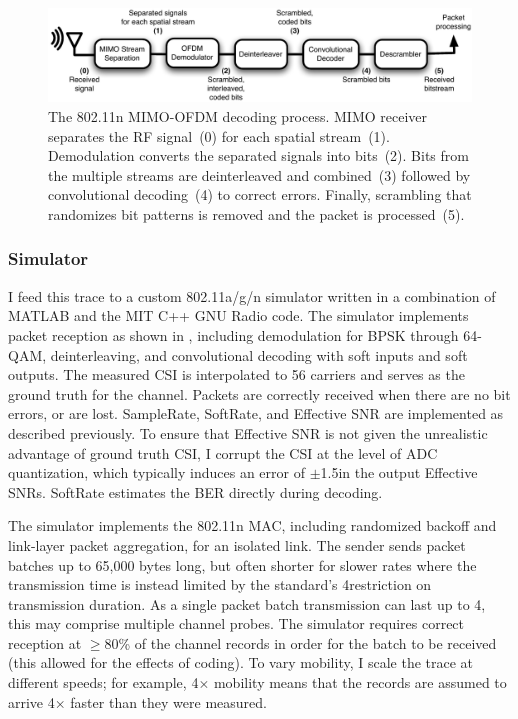 \begin{figure}[ht]
\centering
\includegraphics[width=6in]{figures/esnr/mimo_ofdm_decoding_process.pdf}
\caption[The 802.11n MIMO-OFDM decoding process]{\label{fig:ofdm_decoding} The 802.11n MIMO-OFDM decoding process. MIMO receiver separates the RF signal~(0) for each spatial stream~(1). Demodulation converts the separated signals into bits~(2). Bits from the multiple streams are deinterleaved and combined~(3) followed by convolutional decoding~(4) to correct errors. Finally, scrambling that randomizes bit patterns is removed and the packet is processed~(5).}
\end{figure}


\subsubsection{Simulator}
I feed this trace to a custom 802.11a/g/n simulator written in a combination of MATLAB and the MIT C++ GNU Radio code. The simulator implements packet reception as shown in , including demodulation for BPSK through 64-QAM, deinterleaving, and convolutional decoding with soft inputs and soft outputs. The measured CSI is interpolated to 56 carriers and serves as the ground truth for the channel. Packets are correctly received when there are no bit errors, or are lost. SampleRate, SoftRate, and Effective SNR are implemented as described previously. To ensure that Effective SNR is not given the unrealistic advantage of ground truth CSI, I corrupt the CSI at the level of ADC quantization, which typically induces an error of $\pm$1.5\dB in the output Effective SNRs. SoftRate estimates the BER directly during decoding.

The simulator implements the 802.11n MAC, including randomized backoff and link-layer packet aggregation, for an isolated link. The sender sends packet batches up to 65,000 bytes long, but often shorter for slower rates where the transmission time is instead limited by the standard's 4\ms restriction on transmission duration. As a single packet batch transmission can last up to 4\ms, this may comprise multiple channel probes. The simulator requires correct reception at $\geq$80\% of the channel records in order for the batch to be received (this allowed for the effects of coding). To vary mobility, I scale the trace at different speeds; for example, 4$\times$ mobility means that the records are assumed to arrive 4$\times$ faster than they were measured.

